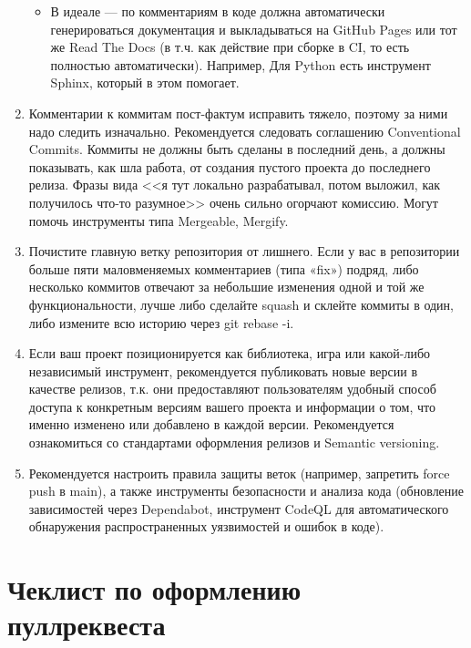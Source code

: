 \documentclass[a5paper]{article}
\begin{document}
\begin{enumerate}
\begin{itemize}
        \item В идеале --- по комментариям в коде должна автоматически генерироваться документация и выкладываться на GitHub Pages или тот же Read The Docs (в т.ч. как действие при сборке в CI, то есть полностью автоматически). Например, Для Python есть инструмент Sphinx, который в этом помогает.
    \end{itemize}
    \item Комментарии к коммитам пост-фактум исправить тяжело, поэтому за ними надо следить изначально. Рекомендуется следовать соглашению Conventional Commits. Коммиты не должны быть сделаны в последний день, а должны показывать, как шла работа, от создания пустого проекта до последнего релиза. Фразы вида <<я тут локально разрабатывал, потом выложил, как получилось что-то разумное>> очень сильно огорчают комиссию. Могут помочь инструменты типа Mergeable, Mergify.
    \item Почистите главную ветку репозитория от лишнего. Если у вас в репозитории больше пяти маловменяемых комментариев (типа «fix») подряд, либо несколько коммитов отвечают за небольшие изменения одной и той же функциональности, лучше либо сделайте squash и склейте коммиты в один, либо измените всю историю через git rebase -i.
    \item Если ваш проект позиционируется как библиотека, игра или какой-либо независимый инструмент, рекомендуется публиковать новые версии в качестве релизов, т.к. они предоставляют пользователям удобный способ доступа к конкретным версиям вашего проекта и информации о том, что именно изменено или добавлено в каждой версии. Рекомендуется ознакомиться со стандартами оформления релизов и Semantic versioning.
    \item Рекомендуется настроить правила защиты веток (например, запретить force push в main), а также инструменты безопасности и анализа кода (обновление зависимостей через Dependabot, инструмент CodeQL для автоматического обнаружения распространенных уязвимостей и ошибок в коде).
\end{enumerate}

\section*{Чеклист по оформлению пуллреквеста}
\end{document}
